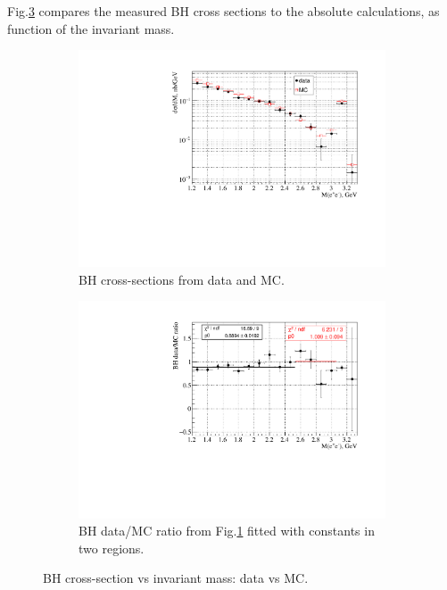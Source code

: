 \documentclass[%
preprint,
nofootinbib,
 amsmath,amssymb,
 aps,
floatfix,
]{revtex4-1}
\begin{document}
Fig.\ref{fig:BH_Minv_data_MC} compares the measured
BH cross sections to the absolute calculations,
as function of the invariant mass.
\begin{figure}[h]
  \begin{subfigure}[b]{0.49\textwidth}
    \includegraphics[width=\textwidth]{./fig/AN2_BH_Minv_comp.pdf}
    \caption{BH cross-sections from data and MC.}
    \label{fig:BH_Minv_comp}
  \end{subfigure}
  \begin{subfigure}[b]{0.49\textwidth}
    \includegraphics[width=\textwidth]{./fig/AN2_BH_Minv_ratio.pdf}
    \caption{BH data/MC ratio from Fig.\ref{fig:BH_Minv_comp} fitted with constants in two regions.}
    \label{fig:BH_Minv_ratio}
  \end{subfigure}
  \caption{
BH cross-section vs invariant mass: data vs MC.
}\label{fig:BH_Minv_data_MC}
\end{figure}
\end{document}
